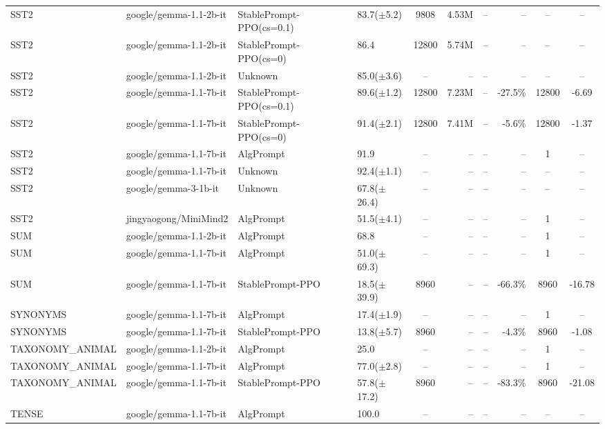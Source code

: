 {\begin{longtable}{@{}p{5.5cm}p{4.5cm}p{2.5cm}lcrrrcc@{}}
\midrule
SST2 & google/gemma-1.1-2b-it & StablePrompt-PPO(cs=0.1) & 83.7($\pm$5.2) & 9808 & 4.53M & -- & -- & -- & -- \\
SST2 & google/gemma-1.1-2b-it & StablePrompt-PPO(cs=0) & 86.4 & 12800 & 5.74M & -- & -- & -- & -- \\
SST2 & google/gemma-1.1-2b-it & Unknown & 85.0($\pm$3.6) & -- & -- & -- & -- & -- & -- \\
\midrule
SST2 & google/gemma-1.1-7b-it & StablePrompt-PPO(cs=0.1) & 89.6($\pm$1.2) & 12800 & 7.23M & -- & -27.5\% & 12800 & -6.69 \\
SST2 & google/gemma-1.1-7b-it & StablePrompt-PPO(cs=0) & 91.4($\pm$2.1) & 12800 & 7.41M & -- & -5.6\% & 12800 & -1.37 \\
SST2 & google/gemma-1.1-7b-it & AlgPrompt & 91.9 & -- & -- & -- & -- & 1 & -- \\
SST2 & google/gemma-1.1-7b-it & Unknown & 92.4($\pm$1.1) & -- & -- & -- & -- & -- & -- \\
\midrule
SST2 & google/gemma-3-1b-it & Unknown & 67.8($\pm$26.4) & -- & -- & -- & -- & -- & -- \\
\midrule
SST2 & jingyaogong/MiniMind2 & AlgPrompt & 51.5($\pm$4.1) & -- & -- & -- & -- & 1 & -- \\
\midrule
SUM & google/gemma-1.1-2b-it & AlgPrompt & 68.8 & -- & -- & -- & -- & 1 & -- \\
\midrule
SUM & google/gemma-1.1-7b-it & AlgPrompt & 51.0($\pm$69.3) & -- & -- & -- & -- & 1 & -- \\
SUM & google/gemma-1.1-7b-it & StablePrompt-PPO & 18.5($\pm$39.9) & 8960 & -- & -- & -66.3\% & 8960 & -16.78 \\
\midrule
SYNONYMS & google/gemma-1.1-7b-it & AlgPrompt & 17.4($\pm$1.9) & -- & -- & -- & -- & 1 & -- \\
SYNONYMS & google/gemma-1.1-7b-it & StablePrompt-PPO & 13.8($\pm$5.7) & 8960 & -- & -- & -4.3\% & 8960 & -1.08 \\
\midrule
TAXONOMY\_ANIMAL & google/gemma-1.1-2b-it & AlgPrompt & 25.0 & -- & -- & -- & -- & 1 & -- \\
\midrule
TAXONOMY\_ANIMAL & google/gemma-1.1-7b-it & AlgPrompt & 77.0($\pm$2.8) & -- & -- & -- & -- & 1 & -- \\
TAXONOMY\_ANIMAL & google/gemma-1.1-7b-it & StablePrompt-PPO & 57.8($\pm$17.2) & 8960 & -- & -- & -83.3\% & 8960 & -21.08 \\
\midrule
TENSE & google/gemma-1.1-7b-it & AlgPrompt & 100.0 & -- & -- & -- & -- & -- & -- \\

\end{longtable}}
